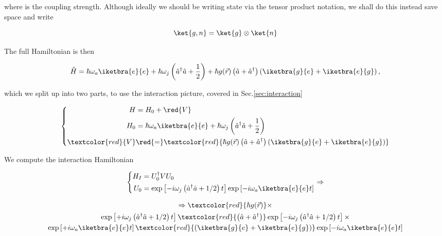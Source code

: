 \noindent where  is the coupling strength. Although ideally we should be writing state via the tensor product notation, we shall do this instead save space and write

\begin{equation}
\ket{g,n}=\ket{g}\otimes\ket{n}
\end{equation}

\noindent The full Hamiltonian is then

\begin{equation}
\hat{H} = \hbar\omega_a\iketbra{e}{e} + \hbar\omega_j\left(\hat{a}^\dagger\hat{a}+\frac{1}{2}\right) + {\hbar g(\vec{r})}\left(\hat{a}+\hat{a}^\dagger\right)\left(\iketbra{g}{e}+\iketbra{e}{g}\right),
\end{equation}

\noindent which we split up into two parts, to use the interaction picture, covered in Sec.\ref{sec:interaction}

\begin{equation}
\left\lbrace 
\begin{aligned}
H & = H_0+\red{V}\\
H_0 & = \hbar\omega_a\iketbra{e}{e} + \hbar\omega_j\left(\hat{a}^\dagger\hat{a}+\frac{1}{2}\right)\\
\textcolor{red}{V} & \red{=} \textcolor{red}{{\hbar g(\vec{r})}\left(\hat{a}+\hat{a}^\dagger\right)\left(\iketbra{g}{e}+\iketbra{e}{g}\right)}
\end{aligned}\right.
\label{eqn:lightAtomHamiltonians}
\end{equation}

\noindent We compute the interaction Hamiltonian

\begin{equation}
\left\lbrace
\begin{aligned}
H_I & = U_0^\dagger V U_0 \\
U_0 & = \exp\left[-i\omega_j\left(\hat{a}^\dagger\hat{a}+{1}/{2}\right)t\right]\exp\left[-i\omega_a\iketbra{e}{e}t\right]
\end{aligned}\right. \Rightarrow
\end{equation}

\begin{multline}
\Rightarrow \textcolor{red}{\hbar g(\vec{r})} \times \\
\exp\left[+i\omega_j\left(\hat{a}^\dagger\hat{a}+{1}/{2}\right)t\right]\textcolor{red}{\left(\hat{a}+\hat{a}^\dagger\right)}\exp\left[-i\omega_j\left(\hat{a}^\dagger\hat{a}+{1}/{2}\right)t\right] \times\\
\exp\left[+i\omega_a\iketbra{e}{e}t\right]\textcolor{red}{\left(\iketbra{g}{e}+\iketbra{e}{g}\right)}\exp\left[-i\omega_a\iketbra{e}{e}t\right]
\end{multline}

